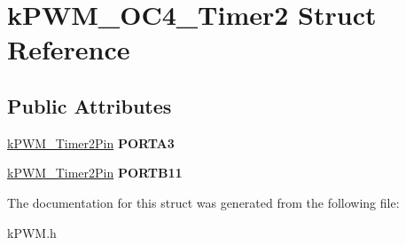 \hypertarget{structkPWM__OC4__Timer2}{}\section{k\+P\+W\+M\+\_\+\+O\+C4\+\_\+\+Timer2 Struct Reference}
\label{structkPWM__OC4__Timer2}
\subsection*{Public Attributes}
\begin{DoxyCompactItemize}
\item 
\hyperlink{structkPWM__Timer2Pin}{k\+P\+W\+M\+\_\+\+Timer2\+Pin} {\bfseries P\+O\+R\+T\+A3}\hypertarget{structkPWM__OC4__Timer2_aee3d8ffd5503012144683cd59bc68f1e}{}\label{structkPWM__OC4__Timer2_aee3d8ffd5503012144683cd59bc68f1e}

\item 
\hyperlink{structkPWM__Timer2Pin}{k\+P\+W\+M\+\_\+\+Timer2\+Pin} {\bfseries P\+O\+R\+T\+B11}\hypertarget{structkPWM__OC4__Timer2_a2f914c4ee986ef7ec358afcc117602d3}{}\label{structkPWM__OC4__Timer2_a2f914c4ee986ef7ec358afcc117602d3}

\end{DoxyCompactItemize}


The documentation for this struct was generated from the following file\+:\begin{DoxyCompactItemize}
\item 
k\+P\+W\+M.\+h\end{DoxyCompactItemize}
